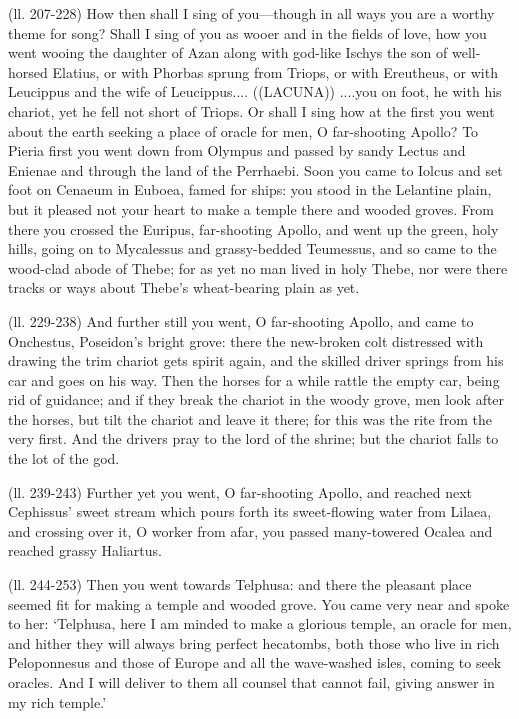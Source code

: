 (ll. 207-228) How then shall I sing of you—though in all ways you are a
worthy theme for song? Shall I sing of you as wooer and in the fields of love,
how you went wooing the daughter of Azan along with god-like Ischys the son of
well-horsed Elatius, or with Phorbas sprung from Triops, or with Ereutheus, or
with Leucippus and the wife of Leucippus.... ((LACUNA)) ....you on foot, he
with his chariot, yet he fell not short of Triops. Or shall I sing how at the
first you went about the earth seeking a place of oracle for men, O
far-shooting Apollo? To Pieria first you went down from Olympus and passed by
sandy Lectus and Enienae and through the land of the Perrhaebi. Soon you came
to Iolcus and set foot on Cenaeum in Euboea, famed for ships: you stood in the
Lelantine plain, but it pleased not your heart to make a temple there and
wooded groves. From there you crossed the Euripus, far-shooting Apollo, and
went up the green, holy hills, going on to Mycalessus and grassy-bedded
Teumessus, and so came to the wood-clad abode of Thebe; for as yet no man lived
in holy Thebe, nor were there tracks or ways about Thebe’s wheat-bearing
plain as yet.

(ll. 229-238) And further still you went, O far-shooting Apollo, and came to
Onchestus, Poseidon’s bright grove: there the new-broken colt distressed
with drawing the trim chariot gets spirit again, and the skilled driver springs
from his car and goes on his way. Then the horses for a while rattle the empty
car, being rid of guidance; and if they break the chariot in the woody grove,
men look after the horses, but tilt the chariot and leave it there; for this
was the rite from the very first. And the drivers pray to the lord of the
shrine; but the chariot falls to the lot of the god.

(ll. 239-243) Further yet you went, O far-shooting Apollo, and reached next
Cephissus’ sweet stream which pours forth its sweet-flowing water from
Lilaea, and crossing over it, O worker from afar, you passed many-towered
Ocalea and reached grassy Haliartus.

(ll. 244-253) Then you went towards Telphusa: and there the pleasant place
seemed fit for making a temple and wooded grove. You came very near and spoke
to her: ‘Telphusa, here I am minded to make a glorious temple, an oracle
for men, and hither they will always bring perfect hecatombs, both those who
live in rich Peloponnesus and those of Europe and all the wave-washed isles,
coming to seek oracles. And I will deliver to them all counsel that cannot
fail, giving answer in my rich temple.’

